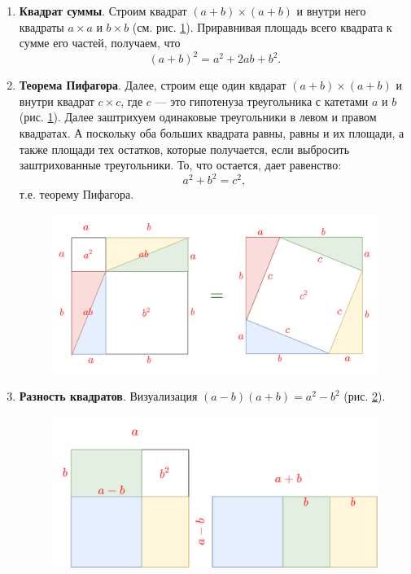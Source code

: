 \begin{enumerate}
\item \textbf{Квадрат суммы}. Строим квадрат $(a+b)\times (a+b)$ и внутри него квадраты $a\times a$ и $b\times b$ (см. рис. \ref{pithagor}). Приравнивая площадь всего квадрата к сумме его частей, получаем, что
$$
(a+b)^2 = a^2 + 2ab + b^2.
$$
\item \textbf{Теорема Пифагора}. Далее, строим еще один квдарат $(a+b)\times (a+b)$ и внутри квадрат $c\times c$, где $c$ --- это гипотенуза треугольника с катетами $a$ и $b$ (рис. \ref{pithagor}). Далее заштрихуем одинаковые треугольники в левом и правом квадратах. А поскольку оба больших квадрата равны, равны и их площади, а также площади тех остатков, которые получается, если выбросить заштрихованные треугольники. То, что остается, дает равенство:
$$
a^2+b^2=c^2,
$$
т.е. теорему Пифагора.

\begin{figure}[hbt!]
\begin{center}
\includegraphics[scale=0.25]{pithagor.png}
\end{center}
\caption{}\label{pithagor}
\end{figure}

\item \textbf{Разность квадратов}. Визуализация $(a-b)(a+b)=a^2-b^2$ (рис. \ref{razn}).
\begin{figure}[hbt!]
\begin{center}
\includegraphics[scale=0.25]{razn.png}
\end{center}
\caption{}\label{razn}
\end{figure}


\end{enumerate}
